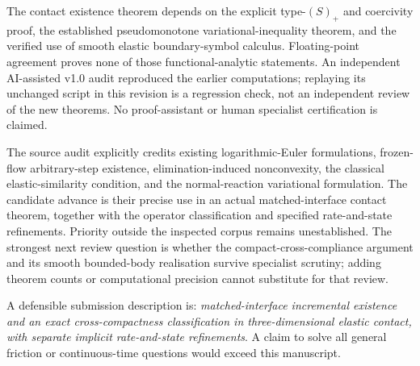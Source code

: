 \documentclass[11pt,a4paper]{article}
\theoremstyle{definition}\newtheorem{definition}[theorem]{Definition}
\theoremstyle{remark}\newtheorem{remark}[theorem]{Remark}
\numberwithin{equation}{section}
\begin{document}
The contact existence theorem depends on the explicit type-$(S)_+$ and coercivity proof, the established pseudomonotone variational-inequality theorem, and the verified use of smooth elastic boundary-symbol calculus. Floating-point agreement proves none of those functional-analytic statements. An independent AI-assisted v1.0 audit reproduced the earlier computations; replaying its unchanged script in this revision is a regression check, not an independent review of the new theorems. No proof-assistant or human specialist certification is claimed.

The source audit explicitly credits existing logarithmic-Euler formulations, frozen-flow arbitrary-step existence, elimination-induced nonconvexity, the classical elastic-similarity condition, and the normal-reaction variational formulation. The candidate advance is their precise use in an actual matched-interface contact theorem, together with the operator classification and specified rate-and-state refinements. Priority outside the inspected corpus remains unestablished. The strongest next review question is whether the compact-cross-compliance argument and its smooth bounded-body realisation survive specialist scrutiny; adding theorem counts or computational precision cannot substitute for that review.

A defensible submission description is: \emph{matched-interface incremental existence and an exact cross-compactness classification in three-dimensional elastic contact, with separate implicit rate-and-state refinements}. A claim to solve all general friction or continuous-time questions would exceed this manuscript.
\end{document}
